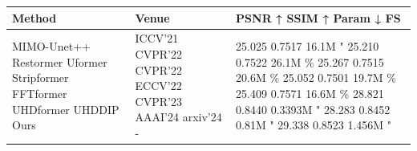 \begin{tabular}{lll}
\toprule
Method & Venue & PSNR ↑ SSIM ↑ Param ↓ FS \\
\midrule
MIMO-Unet++ Restormer Uformer Stripformer FFTformer UHDformer UHDDIP Ours & ICCV’21 CVPR’22 CVPR’22 ECCV’22 CVPR’23 AAAI’24 arxiv’24 - & 25.025 0.7517 16.1M " 25.210 0.7522 26.1M \% 25.267 0.7515 20.6M \% 25.052 0.7501 19.7M \% 25.409 0.7571 16.6M \% 28.821 0.8440 0.3393M " 28.283 0.8452 0.81M " 29.338 0.8523 1.456M " \\
\bottomrule
\end{tabular}
